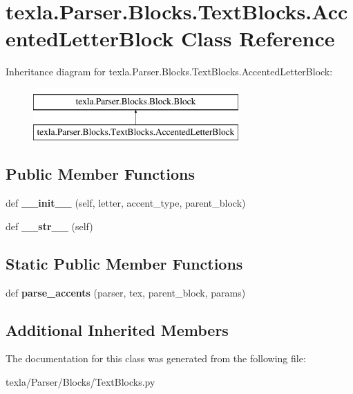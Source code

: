 \hypertarget{classtexla_1_1Parser_1_1Blocks_1_1TextBlocks_1_1AccentedLetterBlock}{}\section{texla.\+Parser.\+Blocks.\+Text\+Blocks.\+Accented\+Letter\+Block Class Reference}
\label{classtexla_1_1Parser_1_1Blocks_1_1TextBlocks_1_1AccentedLetterBlock}
Inheritance diagram for texla.\+Parser.\+Blocks.\+Text\+Blocks.\+Accented\+Letter\+Block\+:\begin{figure}[H]
\begin{center}
\leavevmode
\includegraphics[height=2.000000cm]{classtexla_1_1Parser_1_1Blocks_1_1TextBlocks_1_1AccentedLetterBlock}
\end{center}
\end{figure}
\subsection*{Public Member Functions}
\begin{DoxyCompactItemize}
\item 
\hypertarget{classtexla_1_1Parser_1_1Blocks_1_1TextBlocks_1_1AccentedLetterBlock_a197fa3c5d1d8a6b1b75b82fce61149ab}{}\label{classtexla_1_1Parser_1_1Blocks_1_1TextBlocks_1_1AccentedLetterBlock_a197fa3c5d1d8a6b1b75b82fce61149ab} 
def {\bfseries \+\_\+\+\_\+init\+\_\+\+\_\+} (self, letter, accent\+\_\+type, parent\+\_\+block)
\item 
\hypertarget{classtexla_1_1Parser_1_1Blocks_1_1TextBlocks_1_1AccentedLetterBlock_af185fc3c8e3205e1eac1b3b9dcddb34f}{}\label{classtexla_1_1Parser_1_1Blocks_1_1TextBlocks_1_1AccentedLetterBlock_af185fc3c8e3205e1eac1b3b9dcddb34f} 
def {\bfseries \+\_\+\+\_\+str\+\_\+\+\_\+} (self)
\end{DoxyCompactItemize}
\subsection*{Static Public Member Functions}
\begin{DoxyCompactItemize}
\item 
\hypertarget{classtexla_1_1Parser_1_1Blocks_1_1TextBlocks_1_1AccentedLetterBlock_a60f0dd1d6b63dc79a24a284c60443833}{}\label{classtexla_1_1Parser_1_1Blocks_1_1TextBlocks_1_1AccentedLetterBlock_a60f0dd1d6b63dc79a24a284c60443833} 
def {\bfseries parse\+\_\+accents} (parser, tex, parent\+\_\+block, params)
\end{DoxyCompactItemize}
\subsection*{Additional Inherited Members}


The documentation for this class was generated from the following file\+:\begin{DoxyCompactItemize}
\item 
texla/\+Parser/\+Blocks/Text\+Blocks.\+py\end{DoxyCompactItemize}
